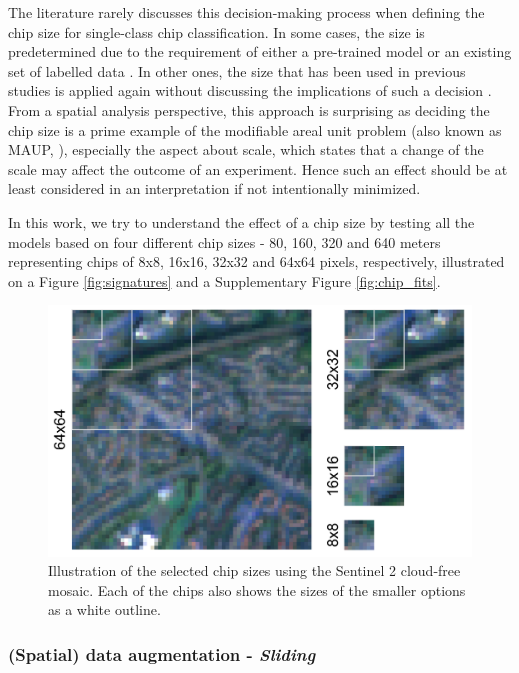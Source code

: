 The literature rarely discusses this decision-making process when defining the chip
size for single-class chip classification. In some cases, the size is predetermined due to the requirement of either a
pre-trained model or an existing set of labelled data \citep{taubenbock2020}. In
other ones, the size that has
been used in previous studies is applied again without discussing the implications
of such a decision \citep{wang2018mapping}. From a spatial analysis
perspective, this approach is surprising as deciding the chip size is a prime example of the
modifiable areal unit problem (also known as MAUP,
\citealp{openshaw1981modifiable}), especially the aspect about scale, which states that
a change of the scale may affect the outcome of an experiment. Hence such an effect
should be at least considered in an interpretation if not intentionally minimized.

In this work, we try to understand the effect of a chip size by testing all the models
based on four different chip sizes - 80, 160, 320 and 640 meters representing chips of
8x8, 16x16, 32x32 and 64x64 pixels, respectively, illustrated on a Figure \ref{fig:signatures}
and a Supplementary Figure \ref{fig:chip_fits}.


\begin{figure}
    \centering
    \includegraphics[width=.8\linewidth]{fig/chips.png}
    \caption{Illustration of the selected chip sizes using the Sentinel 2 cloud-free mosaic. Each of the chips also shows the sizes of the smaller options as a white outline.}
    \label{fig:chips}
\end{figure}



\subsubsection{(Spatial) data augmentation - \textit{Sliding}}

